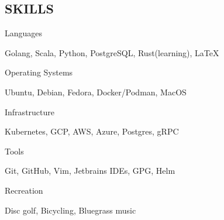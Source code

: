 \documentclass[line, margin, 10.5pt]{res}
\begin{document}
\begin{resume}
\section{\small SKILLS}
\begin{compactdesc}
\item[Languages] \hfill \begin{inparaenum} {Golang, Scala, Python, PostgreSQL, Rust(learning), \LaTeX} \end{inparaenum}
\item[Operating Systems] \hfill \begin{inparaenum} {Ubuntu, Debian, Fedora, Docker/Podman, MacOS} \end{inparaenum}
\item[Infrastructure] \hfill \begin{inparaenum} {Kubernetes, GCP, AWS, Azure, Postgres, gRPC} \end{inparaenum}
\item[Tools] \hfill \begin{inparaenum} {Git, GitHub, Vim, Jetbrains IDEs, GPG, Helm} \end{inparaenum}
\item[Recreation] \hfill \begin{inparaenum} {Disc golf, Bicycling, Bluegrass music} \end{inparaenum}
\end{compactdesc}

\end{resume}
\end{document}
